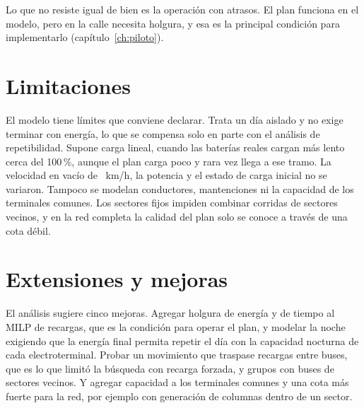 Lo que no resiste igual de bien es la operación con atrasos. El plan funciona en el modelo, pero en la calle necesita holgura, y esa es la principal condición para implementarlo (capítulo~\ref{ch:piloto}).

\section{Limitaciones}
\label{sec:limitaciones}

El modelo tiene límites que conviene declarar. Trata un día aislado y no exige terminar con energía, lo que se compensa solo en parte con el análisis de repetibilidad. Supone carga lineal, cuando las baterías reales cargan más lento cerca del 100\,\%, aunque el plan carga poco y rara vez llega a ese tramo. La velocidad en vacío de \VelocidadVacio~km/h, la potencia y el estado de carga inicial no se variaron. Tampoco se modelan conductores, mantenciones ni la capacidad de los terminales comunes. Los sectores fijos impiden combinar corridas de sectores vecinos, y en la red completa la calidad del plan solo se conoce a través de una cota débil.

\section{Extensiones y mejoras}
\label{sec:extensiones}

El análisis sugiere cinco mejoras. Agregar holgura de energía y de tiempo al MILP de recargas, que es la condición para operar el plan, y modelar la noche exigiendo que la energía final permita repetir el día con la capacidad nocturna de cada electroterminal. Probar un movimiento que traspase recargas entre buses, que es lo que limitó la búsqueda con recarga forzada, y grupos con buses de sectores vecinos. Y agregar capacidad a los terminales comunes y una cota más fuerte para la red, por ejemplo con generación de columnas dentro de un sector.
